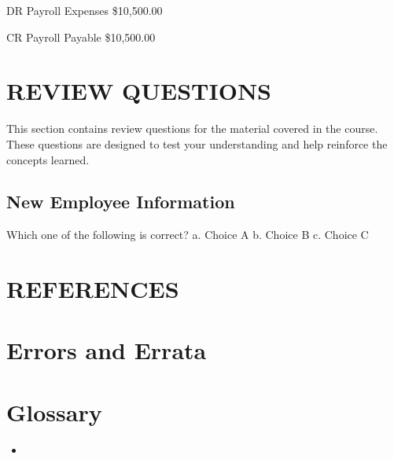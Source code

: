 \documentclass[letterpaper,10pt,english]{sphinxmanual}
\begin{document}
\begin{DUlineblock}{0em}
\item[] DR    Payroll Expenses    \$10,500.00
\item[]
\begin{DUlineblock}{\DUlineblockindent}
\item[] CR  Payroll Payable   \$10,500.00
\end{DUlineblock}
\end{DUlineblock}

\sphinxstepscope


\chapter{REVIEW QUESTIONS}
\label{\detokenize{review_questions:review-questions}}\label{\detokenize{review_questions::doc}}
\sphinxAtStartPar
This section contains review questions for the material covered in the course. These questions are designed to test your understanding and help reinforce the concepts learned.


\section{New Employee Information}
\label{\detokenize{review_questions:new-employee-information}}
\sphinxAtStartPar
Which one of the following is correct?
a. Choice A
b. Choice B
c. Choice C

\sphinxstepscope


\chapter{REFERENCES}
\label{\detokenize{references:references}}\label{\detokenize{references::doc}}
\sphinxstepscope


\chapter{Errors and Errata}
\label{\detokenize{errata:errors-and-errata}}\label{\detokenize{errata::doc}}

\chapter{Glossary}
\label{\detokenize{index:glossary}}\begin{itemize}
\item {} 
\sphinxAtStartPar
{}

\end{itemize}



\renewcommand{\indexname}{Index}
\printindex
\end{document}

